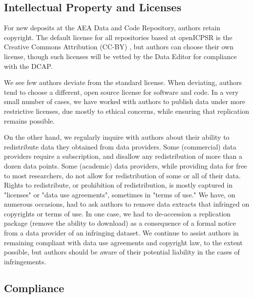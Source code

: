 \documentclass[PP]{AEA}
\newcommand{\aeadcr}{AEA Data and Code Repository}
\begin{document}
\subsection{Intellectual Property and Licenses} 
\label{sec:ip}

For new deposits at the \aeadcr{}, authors retain  copyright. The default license for all repositories based at openICPSR is the  Creative Commons Attribution (CC-BY) \citep{CreativeCommons2017}, but authors can choose their own license,  though such licenses will be vetted by the Data Editor for compliance with the \ac{DCAP}. 

We see few authors deviate from the standard license. When deviating, authors tend to choose a different, open source license \citep{OpenSourceInitiative2018} for software and code. In a very small number of cases, we have worked with authors to publish data under more restrictive licenses, due mostly to ethical concerns, while ensuring that replication remains possible.

On the other hand, we regularly inquire with authors about their ability to redistribute data they obtained from data providers. Some (commercial) data providers require a subscription, and disallow any redistribution of more than a dozen data points. Some (academic) data providers, while providing data for free to most researchers, do not allow for redistribution of some or all of their data. Rights to redistribute, or prohibition of redistribution, is mostly captured in "licenses" or "data use agreements", sometimes in "terms of use." We have, on numerous occasions, had to ask authors to remove data extracts that infringed on copyrights or terms of use. In one case, we had to de-accession a replication package (remove the ability to download) as a consequence of a formal notice from a data provider of an infringing dataset. We continue to assist authors in remaining compliant with data use agreements and copyright law, to the extent possible, but authors should be aware of their potential liability in the cases of infringements. 


\subsection{Compliance}
\label{sec:compliance}
\end{document}
